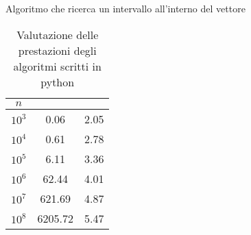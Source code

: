 \begin{algorithm}[H]
\caption{Algoritmo che ricerca un intervallo all'interno del vettore}


\BlankLine
{}
\end{algorithm}


\begin{table}[htbp]\centering
	\caption{Valutazione delle prestazioni degli algoritmi scritti in python}
	\begin{tabular}{@{} S S[table-format=4.2] S[table-format=1.2] @{}}
		\toprule
			\(n\) &  &  \\
		\midrule
			\(10^3\) & 0.06 & 2.05 \\
			\(10^4\) & 0.61 & 2.78 \\
			\(10^5\) & 6.11 & 3.36 \\
			\(10^6\) & 62.44 & 4.01 \\
			\(10^7\) & 621.69 & 4.87 \\
			\(10^8\) & 6205.72 & 5.47 \\
		\bottomrule
	\end{tabular}
\end{table}

\ifsubfile

\fi
